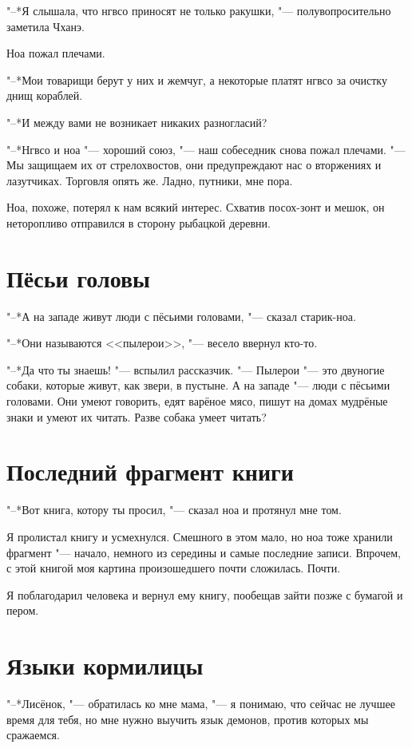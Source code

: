 \documentclass[a4paper,10pt]{book}
\begin{document}
"--*Я слышала, что нгвсо приносят не только ракушки, "--- полувопросительно 
заметила Чханэ.

Ноа пожал плечами.

"--*Мои товарищи берут у них и жемчуг, а некоторые платят нгвсо за очистку днищ 
кораблей.

"--*И между вами не возникает никаких разногласий?

"--*Нгвсо и ноа "--- хороший союз, "--- наш собеседник снова пожал плечами. 
"--- Мы защищаем их от стрелохвостов, они предупреждают нас о вторжениях и 
лазутчиках. Торговля опять же. Ладно, путники, мне пора.

Ноа, похоже, потерял к нам всякий интерес. Схватив посох-зонт и мешок, он 
неторопливо отправился в сторону рыбацкой деревни.
 
\section{Пёсьи головы}
 
"--*А на западе живут люди с пёсьими головами, "--- сказал старик-ноа.

"--*Они называются <<пылерои>>, "--- весело ввернул кто-то.

"--*Да что ты знаешь! "--- вспылил рассказчик. "--- Пылерои "--- это двуногие 
собаки, которые живут, как звери, в пустыне. А на западе "--- люди с пёсьими 
головами. Они умеют говорить, едят варёное мясо, пишут на домах мудрёные знаки 
и умеют их читать. Разве собака умеет читать?
 
\section{Последний фрагмент книги}

"--*Вот книга, котору ты просил, "--- сказал ноа и протянул мне том.

Я пролистал книгу и усмехнулся. Смешного в этом мало, но ноа тоже хранили 
фрагмент "--- начало, немного из середины и самые последние записи. Впрочем, с 
этой книгой моя картина произошедшего почти сложилась. Почти.

Я поблагодарил человека и вернул ему книгу, пообещав зайти позже с бумагой и 
пером.
 
\section{Языки кормилицы}
 
"--*Лисёнок, "--- обратилась ко мне мама, "--- я понимаю, что сейчас не лучшее 
время для тебя, но мне нужно выучить язык демонов, против которых мы сражаемся.
\end{document}
